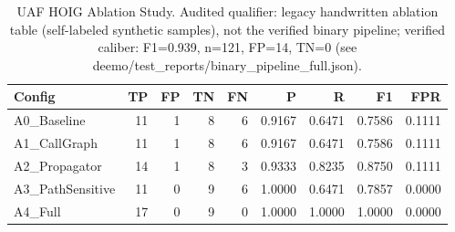 \begin{table}[htbp]
\centering
\caption{UAF HOIG Ablation Study. Audited qualifier: legacy handwritten ablation table (self-labeled synthetic samples), not the verified binary pipeline; verified caliber: F1=0.939, n=121, FP=14, TN=0 (see deemo/test_reports/binary_pipeline_full.json).}
\label{tab:uaf_hoig_ablation}
\begin{tabular}{lrrrrrrrr}
\toprule
Config & TP & FP & TN & FN & P & R & F1 & FPR \\
\midrule
  A0_Baseline & 11 & 1 & 8 & 6 & 0.9167 & 0.6471 & 0.7586 & 0.1111 \\
  A1_CallGraph & 11 & 1 & 8 & 6 & 0.9167 & 0.6471 & 0.7586 & 0.1111 \\
  A2_Propagator & 14 & 1 & 8 & 3 & 0.9333 & 0.8235 & 0.8750 & 0.1111 \\
  A3_PathSensitive & 11 & 0 & 9 & 6 & 1.0000 & 0.6471 & 0.7857 & 0.0000 \\ %
  A4_Full & 17 & 0 & 9 & 0 & 1.0000 & 1.0000 & 1.0000 & 0.0000 \\ %
\bottomrule
\end{tabular}
\end{table}
